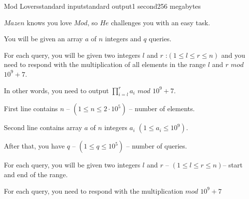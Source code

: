 \begin{problem}{Mod Lovers}{standard input}{standard output}{1 second}{256 megabytes}

$Mazen$ knows you love $Mod$, so $He$ challenges you with an easy task.

You will be given an array $a$ of $n$ integers and $q$ queries.

For each query, you will be given two integers $l$ and $r$ :$(1\le l \le r \le n)$ and you need to respond with the multiplication of all elements in the range $l$ and $r$ $mod$ $10^9+7$.

In other words, you need to output $ {\prod_{i=l}^r a_i}$ $mod$ $10^9+7$.


\InputFile
First line contains $n$ -- $(1\le n \le 2 \cdot 10^5 )$ -- number of elements.

Second line contains array $a$ of $n$ integers $a_i$ $(1 \le a_i \le 10^9)$.

After that, you have $q$ -- $(1\le q \le 10^5)$ -- number of queries.

For each query, you will be given two integers $l$ and $ r$ -- $(1\le l \le r\le n)$-- start and end of the range.


\OutputFile
For each query, you need to respond with the multiplication $mod$ $10^9+7$

\Example

\begin{example}
%
\end{example}

\end{problem}

